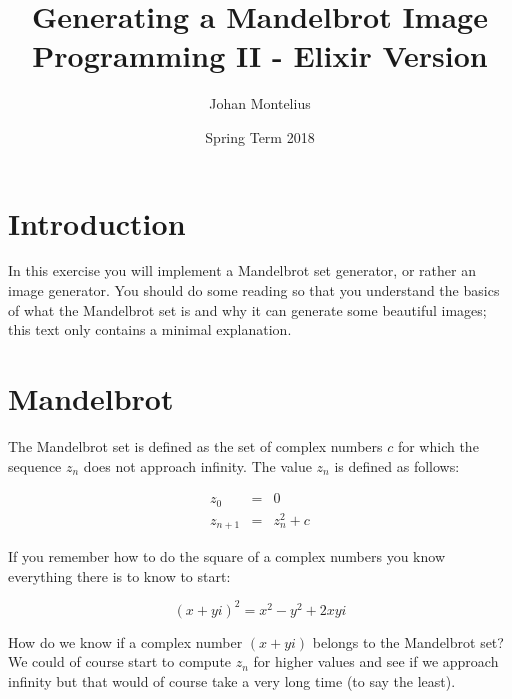 \documentclass[a4paper,11pt]{article}
\begin{document}

\title{
    \textbf{Generating a Mandelbrot Image}\\
    \large{Programming II - Elixir Version}
}
\author{Johan Montelius}
\date{Spring Term 2018}
\maketitle
\thispagestyle{fancy}



\section*{Introduction}

In this exercise you will implement a Mandelbrot set generator, or
rather an image generator. You should do some reading so that you
understand the basics of what the Mandelbrot set is and why it can
generate some beautiful images; this text only contains a minimal
explanation.



\section{Mandelbrot}

The Mandelbrot set is defined as the set of complex numbers $c$ for
which the sequence $z_n$ does not approach infinity. The value $z_n$
is defined as follows:

\begin{eqnarray*}
    z_0 &= &0 \\ 
    z_{n+1} & = &z_n^2 + c
\end{eqnarray*}

If you remember how to do the square of a complex numbers you know
everything there is to know to start:

$$ (x + yi)^2 = x^2 - y^2 + 2xyi$$

How do we know if a complex number $(x + yi)$ belongs to the
Mandelbrot set? We could of course start to compute $z_n$ for higher
values and see if we approach infinity but that would of course take
a very long time (to say the least). 
\end{document}
